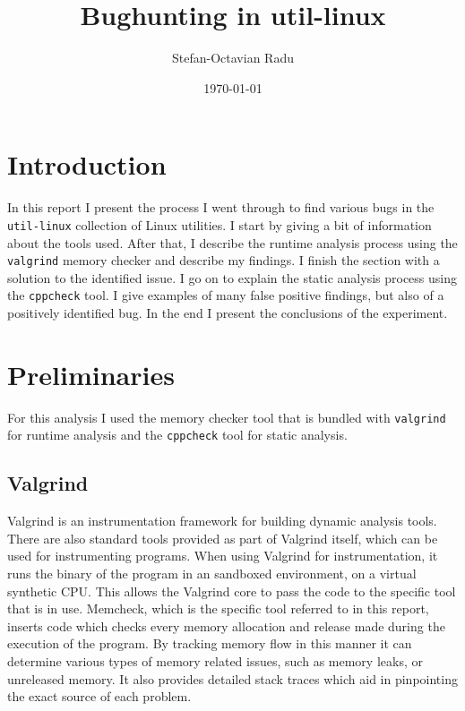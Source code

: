 \documentclass[a4paper,10pt,twocolumn,english]{article}
\title{Bughunting in util-linux}
\author{Stefan-Octavian Radu}
\date{\footnotesize\today}
\begin{document}
\maketitle

\section{Introduction}
      In this report I present the process I went through to find various bugs in the \lstinline{util-linux} collection of Linux utilities. I start by giving a bit of information about the tools used. After that, I describe the runtime analysis process using the \lstinline{valgrind} memory checker and describe my findings. I finish the section with a solution to the identified issue. I go on to explain the static analysis process using the \lstinline{cppcheck} tool. I give examples of many false positive findings, but also of a positively identified bug. In the end I present the conclusions of the experiment.

\section{Preliminaries}

For this analysis I used the memory checker tool that is bundled with \lstinline{valgrind} \cite{valgrind} for runtime analysis and the \lstinline{cppcheck} \cite{cppcheck} tool for static analysis.

\subsection{Valgrind}

Valgrind is an instrumentation framework for building dynamic analysis tools. There are also standard tools provided as part of Valgrind itself, which can be used for instrumenting programs. When using Valgrind for instrumentation, it runs the binary of the program in an sandboxed environment, on a virtual synthetic CPU. This allows the Valgrind core to pass the code to the specific tool that is in use. Memcheck, which is the specific tool referred to in this report, inserts code which checks every memory allocation and release made during the execution of the program. By tracking memory flow in this manner it can determine various types of memory related issues, such as memory leaks, or unreleased memory. It also provides detailed stack traces which aid in pinpointing the exact source of each problem. \cite{valgrindcore}
\end{document}
